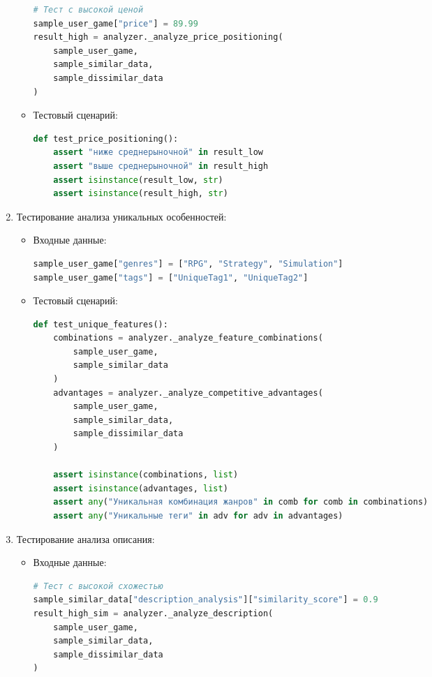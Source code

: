 \documentclass{article}
\begin{document}
\begin{enumerate}[label=\arabic*.]
\begin{itemize}
\begin{lstlisting}[language=Python]
# Тест с высокой ценой
sample_user_game["price"] = 89.99
result_high = analyzer._analyze_price_positioning(
    sample_user_game, 
    sample_similar_data, 
    sample_dissimilar_data
)
        \end{lstlisting}
        \item Тестовый сценарий:
        \begin{lstlisting}[language=Python]
def test_price_positioning():
    assert "ниже среднерыночной" in result_low
    assert "выше среднерыночной" in result_high
    assert isinstance(result_low, str)
    assert isinstance(result_high, str)
        \end{lstlisting}
    \end{itemize}

    \item Тестирование анализа уникальных особенностей:
    \begin{itemize}
        \item Входные данные:
        \begin{lstlisting}[language=Python]
sample_user_game["genres"] = ["RPG", "Strategy", "Simulation"]
sample_user_game["tags"] = ["UniqueTag1", "UniqueTag2"]
        \end{lstlisting}
        \item Тестовый сценарий:
        \begin{lstlisting}[language=Python]
def test_unique_features():
    combinations = analyzer._analyze_feature_combinations(
        sample_user_game, 
        sample_similar_data
    )
    advantages = analyzer._analyze_competitive_advantages(
        sample_user_game, 
        sample_similar_data, 
        sample_dissimilar_data
    )
    
    assert isinstance(combinations, list)
    assert isinstance(advantages, list)
    assert any("Уникальная комбинация жанров" in comb for comb in combinations)
    assert any("Уникальные теги" in adv for adv in advantages)
        \end{lstlisting}
    \end{itemize}

    \item Тестирование анализа описания:
    \begin{itemize}
        \item Входные данные:
        \begin{lstlisting}[language=Python]
# Тест с высокой схожестью
sample_similar_data["description_analysis"]["similarity_score"] = 0.9
result_high_sim = analyzer._analyze_description(
    sample_user_game, 
    sample_similar_data, 
    sample_dissimilar_data
)


\end{lstlisting}
\end{itemize}
\end{enumerate}
\end{document}
